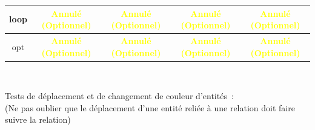 \documentclass[hidelinks, a4paper,11pt,twoside,final]{article}
\begin{document}
\begin{tabular}{|c|c|c|c|c|}
    {loop} & {\textcolor{yellow}{\textbf{Annulé (Optionnel)}}} & {\textcolor{yellow}{\textbf{Annulé (Optionnel)}}} & {\textcolor{yellow}{\textbf{Annulé (Optionnel)}}} & {\textcolor{yellow}{\textbf{Annulé (Optionnel)}}}\\\hline
    {opt} & {\textcolor{yellow}{\textbf{Annulé (Optionnel)}}} & {\textcolor{yellow}{\textbf{Annulé (Optionnel)}}} & {\textcolor{yellow}{\textbf{Annulé (Optionnel)}}} & {\textcolor{yellow}{\textbf{Annulé (Optionnel)}}}\\\hline
    
    \end{tabular}
    \\
    \newpage

    Tests de déplacement et de changement de couleur d’entités~:\\
    (Ne pas oublier que le déplacement d’une entité reliée à une relation doit faire suivre la relation)\\
\end{document}
